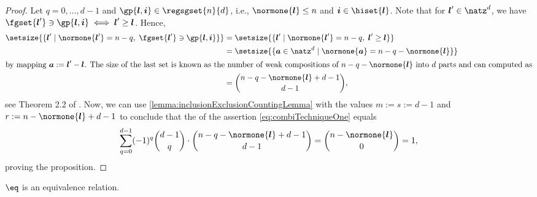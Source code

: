 \propCombiTechniqueOne*

\begin{proof}
  Let $q = 0, \dotsc, d - 1$ and $\gp{\*l,\*i} \in \regsgset{n}{d}$, i.e.,
  $\normone{\*l} \le n$ and $\*i \in \hiset{\*l}$.
  Note that for $\*l' \in \natz^d$, we have
  $\fgset{\*l'} \ni \gp{\*l,\*i} \iff \*l' \ge \*l$.
  Hence,
  \begin{subequations}
    \begin{align}
      \setsize{
        \{\*l' \mid \normone{\*l'} = n - q,\; \fgset{\*l'} \ni \gp{\*l,\*i}\}
      }
      &= \setsize{
        \{\*l' \mid \normone{\*l'} = n - q,\; \*l' \ge \*l\}
      }\\
      &= \setsize{
        \{\*a \in \natz^d \mid \normone{\*a} = n - q - \normone{\*l}\}
      }\\
      \intertext{%
        by mapping $\*a := \*l' - \*l$.
        The size of the last set is
        known as the number of weak compositions
        of $n - q - \normone{\*l}$ into $d$ parts
        and can computed as%
      }
      &= \binom{n - q - \normone{\*l} + d - 1}{d - 1},
    \end{align}
  \end{subequations}
  see Theorem 2.2 of \cite{Miklos15Introduction}.
  Now, we can use \cref{lemma:inclusionExclusionCountingLemma}
  with the values
  $m := s := d - 1$ and
  $r := n - \normone{\*l} + d - 1$
  to conclude that the \lhs of the assertion
  \eqref{eq:combiTechniqueOne} equals
  \begin{equation}
    \sum_{q=0}^{d-1} (-1)^q \binom{d-1}{q} \cdot
    \binom{n - q - \normone{\*l} + d - 1}{d - 1}
    = \binom{n - \normone{\*l}}{0}
    = 1,
  \end{equation}
  proving the proposition.
\end{proof}

\begin{shortlemma}
  \label{lemma:combiTechniqueEquivalenceRelation}
  $\eq$ is an equivalence relation.
\end{shortlemma}

